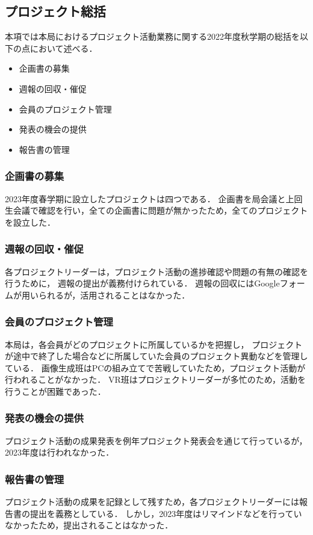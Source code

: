 \subsection*{プロジェクト総括}


本項では本局におけるプロジェクト活動業務に関する2022年度秋学期の総括を以下の点において述べる．

\begin{itemize}
  \item 企画書の募集
  \item 週報の回収・催促
  \item 会員のプロジェクト管理
  \item 発表の機会の提供
  \item 報告書の管理
\end{itemize}

\subsubsection*{企画書の募集}

2023年度春学期に設立したプロジェクトは四つである．
企画書を局会議と上回生会議で確認を行い，全ての企画書に問題が無かったため，全てのプロジェクトを設立した．

\subsubsection*{週報の回収・催促}

各プロジェクトリーダーは，プロジェクト活動の進捗確認や問題の有無の確認を行うために，
週報の提出が義務付けられている．
週報の回収にはGoogleフォームが用いられるが，活用されることはなかった．

\subsubsection*{会員のプロジェクト管理}

本局は，各会員がどのプロジェクトに所属しているかを把握し，
プロジェクトが途中で終了した場合などに所属していた会員のプロジェクト異動などを管理している．
画像生成班はPCの組み立てで苦戦していたため，プロジェクト活動が行われることがなかった．
VR班はプロジェクトリーダーが多忙のため，活動を行うことが困難であった．
\subsubsection*{発表の機会の提供}

プロジェクト活動の成果発表を例年プロジェクト発表会を通じて行っているが，2023年度は行われなかった．

\subsubsection*{報告書の管理}

プロジェクト活動の成果を記録として残すため，各プロジェクトリーダーには報告書の提出を義務としている．
しかし，2023年度はリマインドなどを行っていなかったため，提出されることはなかった．
